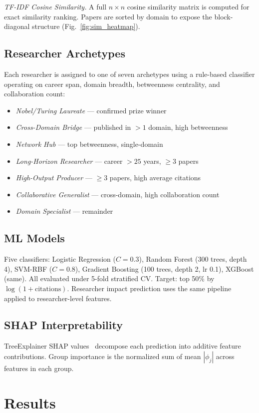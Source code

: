 \documentclass[journal]{IEEEtran}
\begin{document}
\textit{TF-IDF Cosine Similarity.} A full $n \times n$ cosine similarity
matrix is computed for exact similarity ranking. Papers are sorted by domain
to expose the block-diagonal structure (Fig.~\ref{fig:sim_heatmap}).

\subsection{Researcher Archetypes}
Each researcher is assigned to one of seven archetypes using a rule-based
classifier operating on career span, domain breadth, betweenness centrality,
and collaboration count:
\begin{itemize}
    \item \textit{Nobel/Turing Laureate} --- confirmed prize winner
    \item \textit{Cross-Domain Bridge} --- published in $>1$ domain, high betweenness
    \item \textit{Network Hub} --- top betweenness, single-domain
    \item \textit{Long-Horizon Researcher} --- career $>25$ years, $\geq3$ papers
    \item \textit{High-Output Producer} --- $\geq3$ papers, high average citations
    \item \textit{Collaborative Generalist} --- cross-domain, high collaboration count
    \item \textit{Domain Specialist} --- remainder
\end{itemize}

\subsection{ML Models}
Five classifiers: Logistic Regression ($C{=}0.3$), Random Forest (300 trees,
depth 4), SVM-RBF ($C{=}0.8$), Gradient Boosting (100 trees, depth 2, lr 0.1),
XGBoost (same). All evaluated under 5-fold stratified CV. Target: top 50\%
by $\log(1+\text{citations})$. Researcher impact prediction uses the same
pipeline applied to researcher-level features.

\subsection{SHAP Interpretability}
TreeExplainer SHAP values~\cite{Lundberg2017} decompose each prediction into
additive feature contributions. Group importance is the normalized sum of
mean $|\phi_j|$ across features in each group.


\section{Results}
\label{sec:results}
\end{document}
